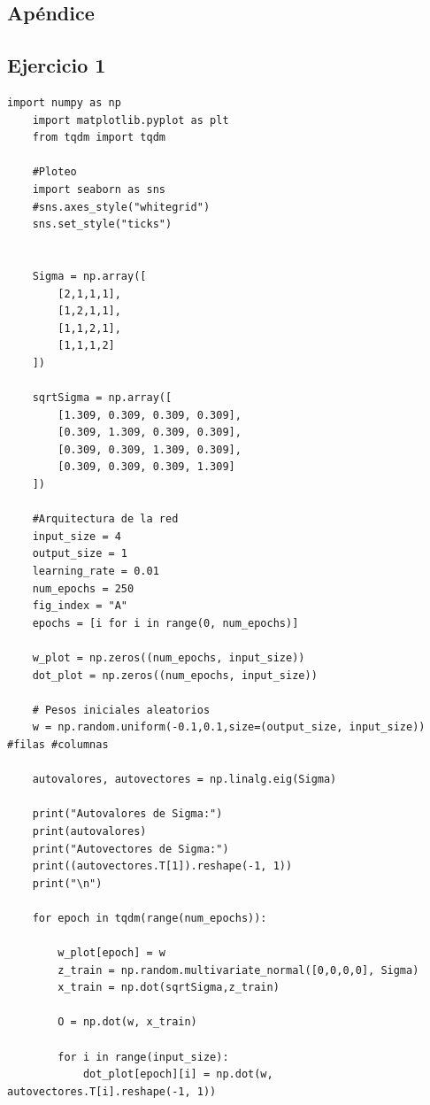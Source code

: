 \documentclass[11pt,twocolumn,twoside]{opticajnl}
\begin{document}
\begin{onecolumn} %
\appendix
\section{Apéndice \label{codigo}}

\scriptsize
\subsection{Ejercicio 1}

\begin{lstlisting}[style=mystyle]
    import numpy as np
    import matplotlib.pyplot as plt
    from tqdm import tqdm
    
    #Ploteo 
    import seaborn as sns
    #sns.axes_style("whitegrid")
    sns.set_style("ticks")
    
    
    Sigma = np.array([
        [2,1,1,1],
        [1,2,1,1],
        [1,1,2,1],
        [1,1,1,2]
    ])
    
    sqrtSigma = np.array([
        [1.309, 0.309, 0.309, 0.309],
        [0.309, 1.309, 0.309, 0.309],
        [0.309, 0.309, 1.309, 0.309],
        [0.309, 0.309, 0.309, 1.309]
    ])
    
    #Arquitectura de la red
    input_size = 4
    output_size = 1
    learning_rate = 0.01
    num_epochs = 250
    fig_index = "A"
    epochs = [i for i in range(0, num_epochs)]
    
    w_plot = np.zeros((num_epochs, input_size))
    dot_plot = np.zeros((num_epochs, input_size))
    
    # Pesos iniciales aleatorios
    w = np.random.uniform(-0.1,0.1,size=(output_size, input_size)) #filas #columnas
    
    autovalores, autovectores = np.linalg.eig(Sigma)
    
    print("Autovalores de Sigma:")
    print(autovalores)
    print("Autovectores de Sigma:")
    print((autovectores.T[1]).reshape(-1, 1))
    print("\n")
    
    for epoch in tqdm(range(num_epochs)):
    
        w_plot[epoch] = w
        z_train = np.random.multivariate_normal([0,0,0,0], Sigma)
        x_train = np.dot(sqrtSigma,z_train)
    
        O = np.dot(w, x_train)
    
        for i in range(input_size):
            dot_plot[epoch][i] = np.dot(w, autovectores.T[i].reshape(-1, 1))
        

\end{lstlisting}
\end{onecolumn}
\end{document}
